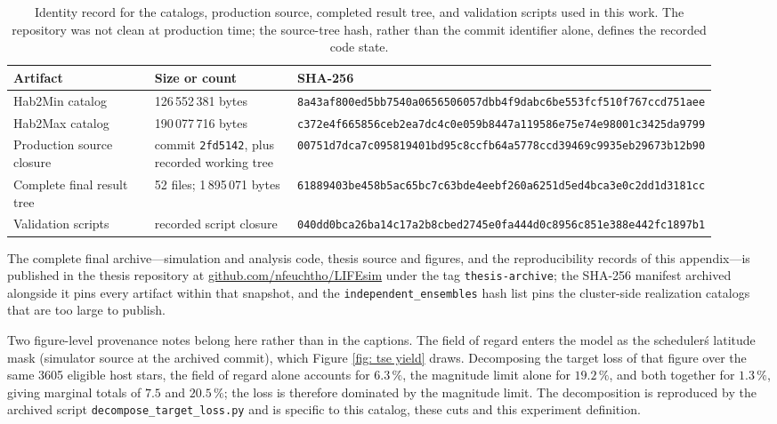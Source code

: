 \documentclass[12pt,a4paper]{article}
\numberwithin{equation}{section}
\numberwithin{figure}{section}
\numberwithin{table}{section}
\begin{document}
\begin{table}[htbp]
\centering
\small
\begin{tabular}{@{}p{0.24\linewidth}p{0.25\linewidth}p{0.43\linewidth}@{}}
\toprule
Artifact & Size or count & SHA-256 \\
\midrule
Hab2Min catalog & 126\,552\,381 bytes & \nolinkurl{8a43af800ed5bb7540a0656506057dbb4f9dabc6be553fcf510f767ccd751aee} \\
Hab2Max catalog & 190\,077\,716 bytes & \nolinkurl{c372e4f665856ceb2ea7dc4c0e059b8447a119586e75e74e98001c3425da9799} \\
Production source closure & commit \texttt{2fd5142}, plus recorded working tree & \nolinkurl{00751d7dca7c095819401bd95c8ccfb64a5778ccd39469c9935eb29673b12b90} \\
Complete final result tree & 52 files; 1\,895\,071 bytes & \nolinkurl{61889403be458b5ac65bc7c63bde4eebf260a6251d5ed4bca3e0c2dd1d3181cc} \\
Validation scripts & recorded script closure & \nolinkurl{040dd0bca26ba14c17a2b8cbed2745e0fa444d0c8956c851e388e442fc1897b1} \\
\bottomrule
\end{tabular}
\caption{Identity record for the catalogs, production source, completed result tree, and validation scripts used in this work. The repository was not clean at production time; the source-tree hash, rather than the commit identifier alone, defines the recorded code state.}
\label{tab: provenance hashes}
\end{table}

The complete final archive---simulation and analysis code, thesis source and figures, and the reproducibility records of this appendix---is published in the thesis repository at \href{https://github.com/nfeuchtho/LIFEsim}{github.com/nfeuchtho/LIFEsim} under the tag \texttt{thesis-archive}; the SHA-256 manifest archived alongside it pins every artifact within that snapshot, and the \texttt{independent\_ensembles} hash list pins the cluster-side realization catalogs that are too large to publish.

Two figure-level provenance notes belong here rather than in the captions. The field of regard enters the model as the scheduler\'s latitude mask (simulator source at the archived commit), which Figure \ref{fig: tse yield} draws. Decomposing the target loss of that figure over the same 3605 eligible host stars, the field of regard alone accounts for $6.3\,\%$, the magnitude limit alone for $19.2\,\%$, and both together for $1.3\,\%$, giving marginal totals of $7.5$ and $20.5\,\%$; the loss is therefore dominated by the magnitude limit. The decomposition is reproduced by the archived script \texttt{decompose\_target\_loss.py} and is specific to this catalog, these cuts and this experiment definition.
\end{document}
